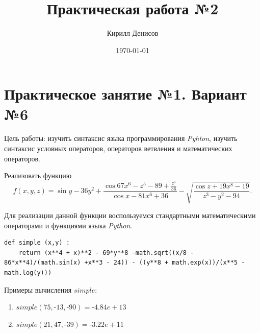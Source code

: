 \documentclass[a4paper,14pt]{extarticle}
\author{Кирилл Денисов}
\title{Практическая работа №2}
\date{\today}
\newcommand{\pathToCommonFolder}{/home/denilai/Desktop/LaTeX/Common}
\begin{document}
\thispagestyle{empty}



\newpage


\section{Практическое занятие №1. Вариант №6}
Цель работы: изучить синтаксис языка программирования \textit{Pyhton}, изучить синтаксис условных операторов, операторов ветвления и математических операторов.


\begin{problem} Реализовать функцию
\[f(x,y,z) = \sin y - 36y^2+\frac{\cos{67x^6-z^5-89}+\frac{z^6}{36}}{\cos x-81x^6+36} - \sqrt{ \frac{\cos z + 19x^8-19}{z^3 - y^2-94} }. \]
\end{problem}
\begin{nonum}
Для реализации данной функции воспользуемся стандартными математическими операторами и функциями языка \textit{Python}.


\vspace{2ex}

\begin{lstlisting}
def simple (x,y) :
	return (x**4 + x)**2 - 69*y**8 -math.sqrt((x/8 - 86*x**4)/(math.sin(x) +x**3 - 24)) - ((y**8 + math.exp(x))/(x**5 - math.log(y)))

\end{lstlisting}
\vspace{3ex}

Примеры вычисления $simple$:
\begin{enumerate}
	\item $simple(75,‐13,‐90) = ‐4.84e+13$
	\item $simple(21,47,‐39) = ‐3.22e+11$
\end{enumerate}

\end{nonum}
\end{document}
